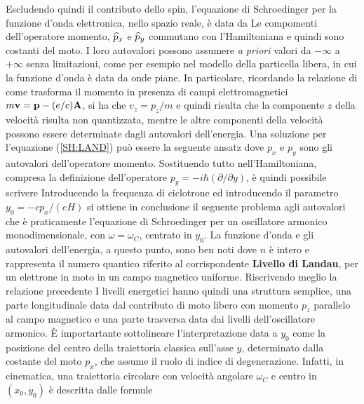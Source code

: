 Escludendo quindi il contributo dello spin, l'equazione di Schroedinger per la funzione d'onda elettronica, nello spazio reale, \`e data da
Le compomenti dell'operatore momento, $\op{p} _x$ e $\op{p} _y$ commutano con l'Hamiltoniana e quindi sono costanti del moto. I loro autovalori possono assumere \textit{a priori} valori da $-\infty$ a $+\infty$ senza limitazioni, come per esempio nel modello della particella libera, in cui la funzione d'onda \`e data da onde piane. In particolare, ricordando la relazione di come trasforma il momento in presenza di campi elettromagnetici $m{\it\bf v} = {\it\bf p} - (e/c){\it\bf A} $, si ha che $v_z = p_z/m$ e quindi risulta che la componente $z$ della velocit\`a risulta non quantizzata, mentre le altre componenti della velocit\`a possono essere determinate dagli autovalori dell'energia. Una soluzione per l'equazione (\ref{SH:LAND}) pu\`o essere la seguente ansatz
dove $p_x$ e $p_y$ sono gli autovalori dell'operatore momento. Sostituendo tutto nell'Hamiltoniana, compresa la definizione dell'operatore $p_y=-i\hbar (\partial / \partial y)$, \`e quindi possibile scrivere
Introducendo la frequenza di ciclotrone ed introducendo il parametro $y_0 = -cp_x/(eH)$ si ottiene in conclusione il seguente problema agli autovalori
che \`e praticamente l'equazione di Schroedinger per un oscillatore armonico monodimensionale, con $\omega = \omega_C$, centrato in $y_0$. La funzione d'onda e gli autovalori dell'energia, a questo punto, sono ben noti
dove $n$ \`e intero e rappresenta il numero quantico riferito al corrispondente \textbf{Livello di Landau}, per un elettrone in moto in un campo magnetico uniforme. Riscrivendo meglio la relazione precedente
\newl{}
I livelli energetici hanno quindi una struttura semplice, una parte longitudinale data dal contributo di moto libero con momento $p_z$ parallelo al campo magnetico e una parte trasversa data dai livelli dell'oscillatore armonico. \`E importartante sottolineare l'interpretazione data a $y_0$ come la posizione del centro della traiettoria classica sull'asse $y$, determinato dalla costante del moto $p_x$, che assume il ruolo di indice di degenerazione. Infatti, in cinematica, una traiettoria circolare con velocit\`a angolare $\omega_C$ e centro in $(x_0,y_0)$ \`e descritta dalle formule
